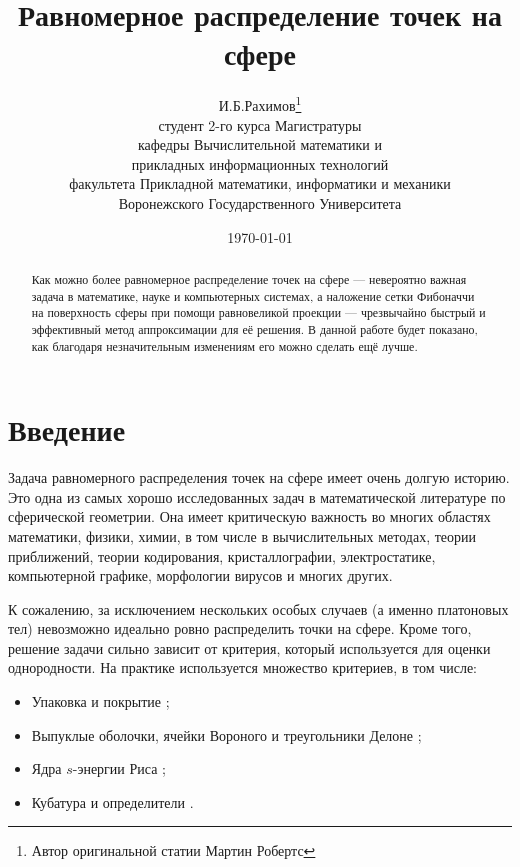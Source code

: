 \documentclass[12pt, a4paper]{article}
\title
{
    Равномерное распределение точек на сфере
}
\author
{
    И.Б.Рахимов\thanks{Автор оригинальной статии Мартин Робертс} \\
    студент 2-го курса Магистратуры  \\
    кафедры Вычислительной математики и \\
    прикладных информационных технологий \\
    факультета Прикладной математики, информатики и механики \\
    Воронежского Государственного Университета
}
\date
{
    \today
}
\begin{document}
\maketitle
\thispagestyle{empty} %

\newpage

\begin{abstract}
Как можно более равномерное распределение точек на сфере — невероятно важная задача в математике, науке и компьютерных системах, а наложение сетки Фибоначчи на поверхность сферы при помощи равновеликой проекции — чрезвычайно быстрый и эффективный метод аппроксимации для её решения. В данной работе будет показано, как благодаря незначительным изменениям его можно сделать ещё лучше.
\end{abstract}

\newpage

\tableofcontents


\newpage

\section*{Введение}

Задача равномерного распределения точек на сфере имеет очень долгую историю. Это одна из самых хорошо исследованных задач в математической литературе по сферической геометрии. Она имеет критическую важность во многих областях математики, физики, химии, в том числе в вычислительных методах, теории приближений, теории кодирования, кристаллографии, электростатике, компьютерной графике, морфологии вирусов и многих других.

К сожалению, за исключением нескольких особых случаев (а именно платоновых тел) невозможно идеально ровно распределить точки на сфере. Кроме того, решение задачи сильно зависит от критерия, который используется для оценки однородности. На практике используется множество критериев, в том числе:

\begin{itemize}
    \item Упаковка и покрытие \cite{alaxandrow_2009};
    \item Выпуклые оболочки, ячейки Вороного и треугольники Делоне \cite{alaxandrow_2009, berg_2016};
    \item Ядра $s$-энергии Риса \cite{alaxandrow_2009, berg_2016, demidovich_2019};
    \item Кубатура и определители \cite{alaxandrow_2009, demidovich_2019}.
\end{itemize}
\end{document}
